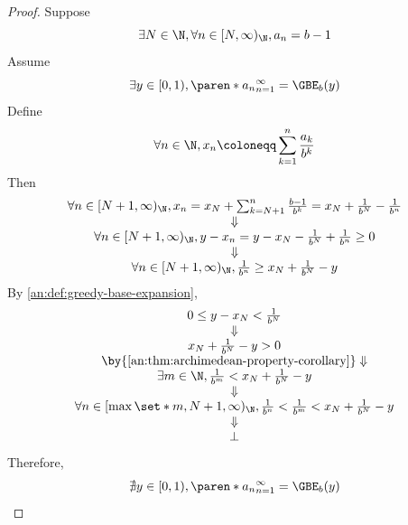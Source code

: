 \begin{proof}
  Suppose
  \[
    \exists N \in \N, \forall n \in [N, \infty)_{\N}, a_{n} = b - 1
  \]
  Assume
  \[
    \exists y \in [0, 1), \paren*{a_{n}}_{n = 1}^{\infty} = \GBE_{b}(y)
  \]
  Define
  \[
    \forall n \in \N, x_{n} \coloneqq \sum_{k = 1}^{n} \frac{a_{k}}{b^{k}}
  \]
  Then
  \[
    \begin{array}{c}
      \forall n \in [N + 1, \infty)_{\N}, x_{n} = x_{N} + \sum_{k = N + 1}^{n}
      \frac{b - 1}{b^{k}} = x_{N} + \frac{1}{b^{N}} - \frac{1}{b^{n}}                                       \\
      \Downarrow                                                                                            \\
      \forall n \in [N + 1, \infty)_{\N},  y - x_{n} = y - x_{N} - \frac{1}{b^{N}} + \frac{1}{b^{n}} \geq 0 \\
      \Downarrow                                                                                            \\
      \forall n \in [N + 1, \infty)_{\N},  \frac{1}{b^{n}} \geq x_{N} + \frac{1}{b^{N}} - y
    \end{array}
  \]
  By \cref{an:def:greedy-base-expansion},
  \[
    \begin{array}{c}
      0 \leq y - x_{N} < \frac{1}{b^{N}}                               \\
      \Downarrow                                                       \\
      x_{N} + \frac{1}{b^{N}} - y > 0                                  \\
      \by{\Cref{an:thm:archimedean-property-corollary}} \Downarrow     \\
      \exists m \in \N, \frac{1}{b^{m}} < x_{N} + \frac{1}{b^{N}} - y  \\
      \Downarrow                                                       \\
      \forall n \in [\max{\set*{m, N}} + 1, \infty)_{\N},
      \frac{1}{b^{n}} < \frac{1}{b^{m}} <  x_{N} + \frac{1}{b^{N}} - y \\
      \Downarrow                                                       \\
      \bot
    \end{array}
  \]
  Therefore,
  \[
    \nexists y \in [0, 1), \paren*{a_{n}}_{n = 1}^{\infty} = \GBE_{b}(y)
  \]
\end{proof}
